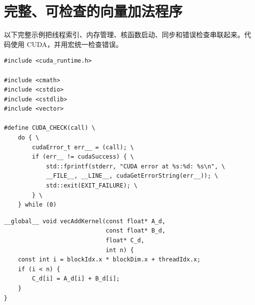 \section{完整、可检查的向量加法程序}

\par\noindent\begin{minipage}{\linewidth}
以下完整示例把线程索引、内存管理、核函数启动、同步和错误检查串联起来。代码使用 CUDA，并用宏统一检查错误。

\begin{lstlisting}[style=cuda]
#include <cuda_runtime.h>

#include <cmath>
#include <cstdio>
#include <cstdlib>
#include <vector>

#define CUDA_CHECK(call) \
    do { \
        cudaError_t err__ = (call); \
        if (err__ != cudaSuccess) { \
            std::fprintf(stderr, "CUDA error at %s:%d: %s\n", \
            __FILE__, __LINE__, cudaGetErrorString(err__)); \
            std::exit(EXIT_FAILURE); \
        } \
    } while (0)
\end{lstlisting}
\end{minipage}\par

\par\noindent\begin{minipage}{\linewidth}
\begin{lstlisting}[style=cuda,firstnumber=18]
__global__ void vecAddKernel(const float* A_d,
                             const float* B_d,
                             float* C_d,
                             int n) {
    const int i = blockIdx.x * blockDim.x + threadIdx.x;
    if (i < n) {
        C_d[i] = A_d[i] + B_d[i];
    }
}
\end{lstlisting}
\end{minipage}\par

